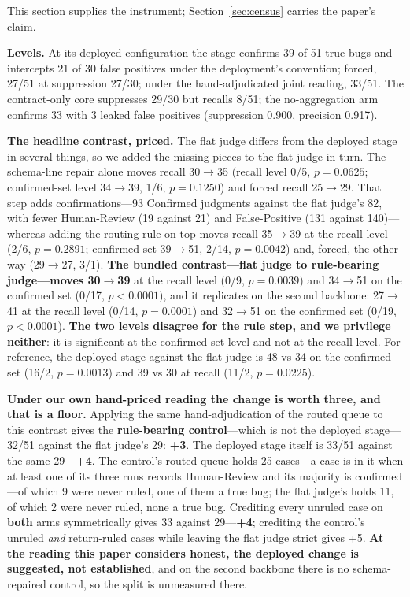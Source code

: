 \documentclass[acmsmall,screen,review,anonymous]{acmart}
\begin{document}
This section supplies the instrument; Section~\ref{sec:census} carries the paper's claim.

\textbf{Levels.} At its deployed configuration the stage confirms 39 of 51 true bugs and intercepts
21 of 30 false positives under the deployment's convention; forced, 27/51 at suppression 27/30;
under the hand-adjudicated joint reading, 33/51. The contract-only core suppresses 29/30 but recalls
8/51; the no-aggregation arm confirms 33 with 3 leaked false positives (suppression 0.900, precision
0.917).

\textbf{The headline contrast, priced.} The flat judge differs from the deployed stage in several
things, so we added the missing pieces to the flat judge in turn. The schema-line repair alone moves
recall 30$\to$35 (recall level 0/5, $p{=}0.0625$; confirmed-set level 34$\to$39, 1/6,
$p{=}0.1250$) and forced recall 25$\to$29. That step adds confirmations---93 Confirmed judgments
against the flat judge's 82, with fewer Human-Review (19 against 21) and False-Positive (131 against
140)---whereas adding the routing rule on top moves recall 35$\to$39 at
the recall level (2/6, $p{=}0.2891$; confirmed-set 39$\to$51, 2/14, $p{=}0.0042$) and, forced, the
other way (29$\to$27, 3/1). \textbf{The bundled contrast---flat judge to rule-bearing judge---moves
30$\to$39} at the recall level (0/9, $p{=}0.0039$) and 34$\to$51 on the confirmed set (0/17,
$p{<}0.0001$), and it replicates on the second backbone: 27$\to$41 at the recall level (0/14,
$p{=}0.0001$) and 32$\to$51 on the confirmed set (0/19, $p{<}0.0001$). \textbf{The two levels
disagree for the rule step, and we privilege neither}: it is significant at the confirmed-set level
and not at the recall level. For reference, the deployed stage against the flat judge is 48 vs 34 on
the confirmed set (16/2, $p{=}0.0013$) and 39 vs 30 at recall (11/2, $p{=}0.0225$).

\textbf{Under our own hand-priced reading the change is worth three, and that is a floor.} Applying
the same hand-adjudication of the routed queue to this contrast gives the \textbf{rule-bearing
control}---which is not the deployed stage---32/51 against the flat judge's 29: \textbf{+3}. The
deployed stage itself is 33/51 against the same 29---\textbf{+4}. The control's routed queue holds 25
cases---a case is in it when at least one of its three runs records Human-Review and its majority is
confirmed---of which 9 were never ruled, one of them a true bug; the flat judge's holds 11, of which
2 were never ruled, none a true bug. Crediting every unruled case on \textbf{both} arms symmetrically gives
33 against 29---\textbf{+4}; crediting the control's unruled \emph{and} return-ruled cases while
leaving the flat judge strict gives +5. \textbf{At the reading this paper considers honest, the
deployed change is suggested, not established}, and on the second backbone there is no
schema-repaired control, so the split is unmeasured there.
\end{document}
